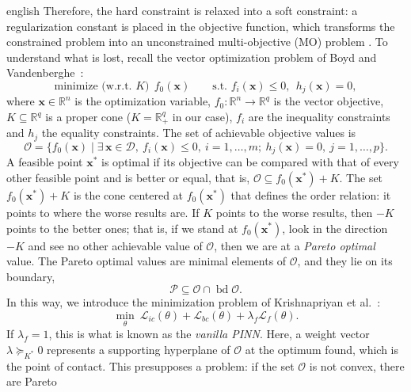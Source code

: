 \documentclass[12pt,letterpaper,twoside]{book}
\newcommand{\Loss}{\mathcal{L}}
\begin{document}
\begin{hyphenrules}{english}
Therefore, the hard constraint is relaxed into a soft constraint: a regularization constant is placed in
the objective function, which transforms the constrained problem into an unconstrained multi-objective
(MO) problem \cite{krishnapriyan2021}. To understand what is lost, recall the vector optimization
problem of Boyd and Vandenberghe~\cite{boyd2004}:
\begin{equation}
  \text{minimize (w.r.t. } K)\ \ f_0(\mathbf{x})\qquad\text{s.t. } f_i(\mathbf{x})\le0,\ \ h_j(\mathbf{x})=0,
  \label{eq:vector-opt}
\end{equation}
where $\mathbf{x}\in\mathbb{R}^n$ is the optimization variable, $f_0:\mathbb{R}^n\to\mathbb{R}^q$ is the vector objective,
$K\subseteq\mathbb{R}^q$ is a proper cone ($K=\mathbb{R}^q_+$ in our case), $f_i$ are the inequality constraints and
$h_j$ the equality constraints. The set of achievable objective values is
\begin{equation}
  \mathcal{O}=\{f_0(\mathbf{x})\mid\exists\,\mathbf{x}\in\mathcal{D},\ f_i(\mathbf{x})\le0,\ i=1,\dots,m;\ h_j(\mathbf{x})=0,\ j=1,\dots,p\}.
  \label{eq:achievable-set}
\end{equation}
A feasible point $\mathbf{x}^{*}$ is optimal if its objective can be compared with that of every other feasible
point and is better or equal, that is, $\mathcal{O}\subseteq f_0(\mathbf{x}^{*})+K$. The set $f_0(\mathbf{x}^{*})+K$ is
the cone centered at $f_0(\mathbf{x}^{*})$ that defines the order relation: it points to where the worse results
are. If $K$ points to the worse results, then $-K$ points to the better ones; that is, if we stand at
$f_0(\mathbf{x}^{*})$, look in the direction $-K$ and see no other achievable value of $\mathcal{O}$, then we are at
a \emph{Pareto optimal} value. The Pareto optimal values are minimal elements of $\mathcal{O}$, and they
lie on its boundary,
\begin{equation}
  \mathcal{P}\subseteq\mathcal{O}\cap\operatorname{bd}\mathcal{O}.
  \label{eq:pareto}
\end{equation}
In this way, we introduce the minimization problem of Krishnapriyan et al.~\cite{krishnapriyan2021}:
\begin{equation}
  \min_{\theta}\ \Loss_{ic}(\theta)+\Loss_{bc}(\theta)+\lambda_f\Loss_f(\theta).
  \label{eq:soft}
\end{equation}
If $\lambda_f=1$, this is what is known as the \emph{vanilla PINN}. Here, a weight vector
$\lambda\succeq_{K^{*}}0$ represents a supporting hyperplane of $\mathcal{O}$ at the optimum found, which is
the point of contact. This presupposes a problem: if the set $\mathcal{O}$ is not convex, there are Pareto

\end{hyphenrules}
\end{document}
